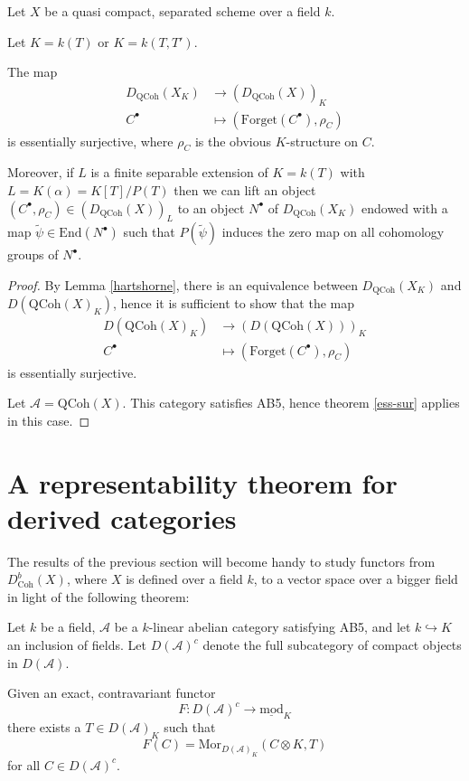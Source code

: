 \documentclass{amsart}
\begin{document}
\begin{corollary}\label{lift}
Let $X$ be a quasi compact, separated scheme over a field $k$.

Let $K=k(T)$ or $K=k(T,T')$.

The map
\begin{align*}
D_{\mathrm{QCoh}}(X_{K}) & \longrightarrow  (D_{\mathrm{QCoh}}(X))_{K} \\
C^{\bullet} &\mapsto (\mathrm{Forget}(C^{\bullet}),\rho_{C})
\end{align*}
is essentially surjective, where $\rho_{C}$ is the obvious $K$-structure on $C$.

Moreover, if $L$ is a finite separable extension of $K=k(T)$ with $L=K(\alpha)=K[T]/P(T)$ then we can lift an object $(C^{\bullet}, \rho_{C})\in (D_{\mathrm{QCoh}}(X))_{L}$ to an object $N^{\bullet}$ of $D_{\mathrm{QCoh}}(X_{K})$ endowed with a map $\tilde{\psi}\in \mathrm{End}(N^{\bullet})$ such that $P(\tilde{\psi})$ induces the zero map on all cohomology groups of $N^{\bullet}$.
\end{corollary}

\begin{proof}
By Lemma \ref{hartshorne}, there is an equivalence between $D_{\mathrm{QCoh}}(X_{K})$ and $D(\mathrm{QCoh}(X)_{K})$, hence it is sufficient to show that the map
\begin{align*}
D(\mathrm{QCoh}(X)_{K}) & {\rightarrow}  (D(\mathrm{QCoh}(X)))_{K} \\
C^{\bullet} &\mapsto (\mathrm{Forget}(C^{\bullet}),\rho_{C})
\end{align*}
is essentially surjective.

Let $\mathcal{A}=\mathrm{QCoh}(X)$. This category satisfies AB5, hence theorem \ref{ess-sur} applies in this case.
\end{proof}

\section{A representability theorem for derived categories}
The results of the previous section will become handy to study functors from $D^{b}_{\mathrm{Coh}}(X)$, where $X$ is defined over a field $k$, to a vector space over a bigger field in light of the following theorem:

\begin{theorem}\label{representable}
Let $k$ be a field, $\mathcal{A}$ be a $k$-linear abelian category satisfying AB5, and let $k\hookrightarrow K$ an inclusion of fields. Let $D(\mathscr{A})^{c}$ denote the full subcategory of compact objects in $D(\mathscr{A})$.

Given an exact, contravariant functor 
$$F:D(\mathscr{A})^{c}{\rightarrow} \underline{\mathrm{mod}}_{K}$$
there exists a $T\in D(\mathscr{A})_{K}$ such that 
$$F(C)=\mathrm{Mor}_{D(\mathscr{A})_{K}}(C\otimes K,T)$$
for all $C\in D(\mathscr{A})^{c}$.
\end{theorem}
\end{document}
